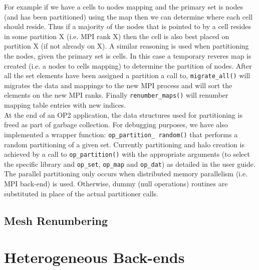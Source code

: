 \documentclass[11pt]{article}
\begin{document}
For example if we have a cells to nodes mapping and the primary set is nodes (and has been partitioned) using the
map then we can determine where each cell should reside. Thus if a majority of the nodes that is pointed to by a cell
resides in some partition X (i.e. MPI rank X) then the cell is also best placed on partition X (if not already on X). A
similar reasoning is used when partitioning the nodes, given the primary set is cells. In this case a temporary reveres
map is created (i.e. a nodes to cells mapping) to determine the partition of nodes. After all the set elements have been
assigned a partition a call to, \texttt{migrate\_all()} will migrates the data and mappings to the new MPI process and
will sort the elements on the new MPI ranks. Finally \texttt{renumber\_maps()} will renumber mapping table entries with
new indices.\\

\noindent At the end of an OP2 application, the data structures used for partitioning is freed as part of garbage
collection. For debugging purposes, we have also implemented a wrapper function: \texttt{op\_partition\_ random()} that
performs a random partitioning of a given set. Currently partitioning and halo creation is achieved by a call to
\texttt{op\_partition()} with the appropriate arguments (to select the specific library and \texttt{op\_set},
\texttt{op\_map} and \texttt{op\_dat}) as detailed in the user guide. The parallel partitioning only occurs when
distributed memory parallelism (i.e. MPI back-end) is used. Otherwise, dummy (null operations) routines are substituted
in place of the actual partitioner calls.

\subsection{Mesh Renumbering}\label{subsec/meshrenum}






\newpage
\section{Heterogeneous Back-ends}\label{sec/heterogeneous}
\end{document}
